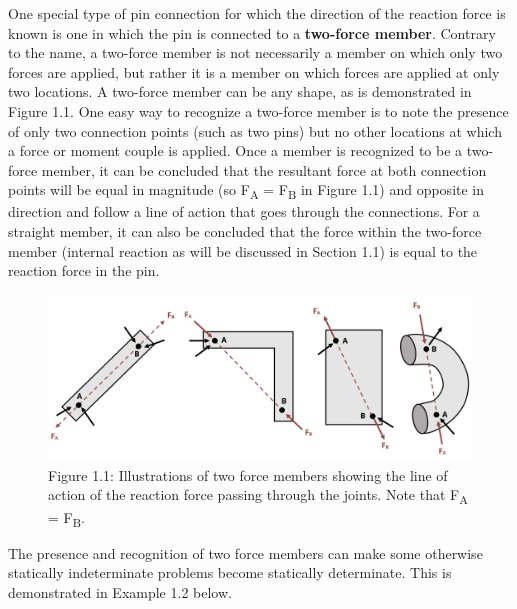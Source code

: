 \documentclass[
  letterpaper,
  DIV=11,
  numbers=noendperiod]{scrreprt}
\begin{document}
One special type of pin connection for which the direction of the
reaction force is known is one in which the pin is connected to a
\textbf{two-force member}. Contrary to the name, a two-force member is
not necessarily a member on which only two forces are applied, but
rather it is a member on which forces are applied at only two locations.
A two-force member can be any shape, as is demonstrated in Figure 1.1.
One easy way to recognize a two-force member is to note the presence of
only two connection points (such as two pins) but no other locations at
which a force or moment couple is applied. Once a member is recognized
to be a two-force member, it can be concluded that the resultant force
at both connection points will be equal in magnitude (so
F\textsubscript{A} = F\textsubscript{B} in Figure 1.1) and opposite in
direction and follow a line of action that goes through the connections.
For a straight member, it can also be concluded that the force within
the two-force member (internal reaction as will be discussed in Section
1.1) is equal to the reaction force in the pin.

\begin{figure}[H]

{\centering \includegraphics[width=6.6875in,height=\textheight]{images/CH1 PNGs/figure 1.1.png}

}

\caption{Figure 1.1: Illustrations of two force members showing the line
of action of the reaction force passing through the joints. Note that
F\textsubscript{A} = F\textsubscript{B}.}

\end{figure}%

The presence and recognition of two force members can make some
otherwise statically indeterminate problems become statically
determinate. This is demonstrated in Example 1.2 below.
\end{document}
